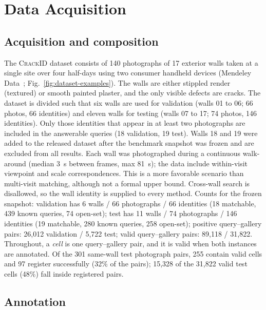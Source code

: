 \section{Data Acquisition}
\label{sec:dataset}

\subsection{Acquisition and composition}

The \textsc{CrackID} dataset consists of 140 photographs of 17 exterior walls taken at a single site over four half-days using two consumer handheld devices (Mendeley Data~\cite{ferramenta2026crackid}; Fig.~\ref{fig:dataset-examples}).
The walls are either stippled render (textured) or smooth painted plaster, and the only visible defects are cracks.
The dataset is divided such that six walls are used for validation (walls 01 to 06; 66 photos, 66 identities) and eleven walls for testing (walls 07 to 17; 74 photos, 146 identities).
Only those identities that appear in at least two photographs are included in the answerable queries (18 validation, 19 test).
Walls 18 and 19 were added to the released dataset after the benchmark snapshot was frozen and are excluded from all results.
Each wall was photographed during a continuous walk-around (median 3~s between frames, max 81~s); the data include within-visit viewpoint and scale correspondences.
This is a more favorable scenario than multi-visit matching, although not a formal upper bound.
Cross-wall search is disallowed, so the wall identity is supplied to every method.
Counts for the frozen snapshot: validation has 6 walls / 66 photographs / 66 identities (18 matchable, 439 known queries, 74 open-set); test has 11 walls / 74 photographs / 146 identities (19 matchable, 280 known queries, 258 open-set); positive query--gallery pairs: 26,012 validation / 5,722 test; valid query--gallery pairs: 89,118 / 31,822.
Throughout, a \emph{cell} is one query--gallery pair, and it is valid when both instances are annotated.
Of the 301 same-wall test photograph pairs, 255 contain valid cells and 97 register successfully (32\% of the pairs); 15,328 of the 31,822 valid test cells (48\%) fall inside registered pairs.

\subsection{Annotation}
\label{sec:annotation}

